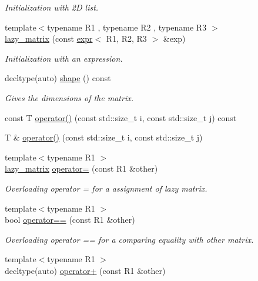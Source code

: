 \begin{DoxyCompactItemize}
\begin{DoxyCompactList}\small\item\em Initialization with 2D list. \end{DoxyCompactList}\item 
{\footnotesize template$<$typename R1 , typename R2 , typename R3 $>$ }\\\mbox{\hyperlink{classlazy__matrix_af27fa9d4de82b3b89eae883404a8033d}{lazy\+\_\+matrix}} (const \mbox{\hyperlink{classexpr}{expr}}$<$ R1, R2, R3 $>$ \&exp)
\begin{DoxyCompactList}\small\item\em Initialization with an expression. \end{DoxyCompactList}\item 
decltype(auto) \mbox{\hyperlink{classlazy__matrix_a01de84f2c1dcaff51f2ac1eeee3427c6}{shape}} () const
\begin{DoxyCompactList}\small\item\em Gives the dimensions of the matrix. \end{DoxyCompactList}\item 
const T \mbox{\hyperlink{classlazy__matrix_a6d81b29ae59ada2332c1b16a889e3350}{operator()}} (const std\+::size\+\_\+t i, const std\+::size\+\_\+t j) const
\item 
T \& \mbox{\hyperlink{classlazy__matrix_ad87bc3cf498acf5480fc0a539c5d3a0a}{operator()}} (const std\+::size\+\_\+t i, const std\+::size\+\_\+t j)
\item 
{\footnotesize template$<$typename R1 $>$ }\\\mbox{\hyperlink{classlazy__matrix}{lazy\+\_\+matrix}} \mbox{\hyperlink{classlazy__matrix_a3104aa043b2a46f335aa697834634b7a}{operator=}} (const R1 \&other)
\begin{DoxyCompactList}\small\item\em Overloading operator = for a assignment of lazy matrix. \end{DoxyCompactList}\item 
{\footnotesize template$<$typename R1 $>$ }\\bool \mbox{\hyperlink{classlazy__matrix_a757be4c2224a2ecbac0dc49e0a8a486b}{operator==}} (const R1 \&other)
\begin{DoxyCompactList}\small\item\em Overloading operator == for a comparing equality with other matrix. \end{DoxyCompactList}\item 
{\footnotesize template$<$typename R1 $>$ }\\decltype(auto) \mbox{\hyperlink{classlazy__matrix_a591fc5b952ef341dcb3a20051fd7aa96}{operator+}} (const R1 \&other)

\end{DoxyCompactItemize}
